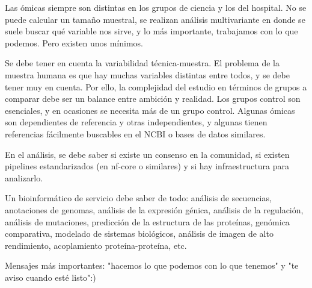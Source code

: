 Las ómicas siempre son distintas en los grupos de ciencia y los del hospital. No se puede calcular un tamaño muestral, se realizan análisis multivariante en donde se suele buscar qué variable nos sirve, y lo más importante, trabajamos con lo que podemos. Pero existen unos mínimos. 

Se debe tener en cuenta la variabilidad técnica-muestra. El problema de la muestra humana es que hay muchas variables distintas entre todos, y se debe tener muy en cuenta. Por ello, la complejidad del estudio en términos de grupos a comparar debe ser un balance entre ambición y realidad. Los grupos control son esenciales, y en ocasiones se necesita más de un grupo control. Algunas ómicas son dependientes de referencia y otras independientes, y algunas tienen referencias fácilmente buscables en el NCBI o bases de datos similares. 

En el análisis, se debe saber si existe un consenso en la comunidad, si existen pipelines estandarizados (en nf-core o similares) y si hay infraestructura para analizarlo. 

Un bioinformático de servicio debe saber de todo: análisis de secuencias, anotaciones de genomas, análisis de la expresión génica, análisis de la regulación, análisis de mutaciones, predicción de la estructura de las proteínas, genómica comparativa, modelado de sistemas biológicos, análisis de imagen de alto rendimiento, acoplamiento proteína-proteína, etc.

Mensajes más importantes: "hacemos lo que podemos con lo que tenemos" y "te aviso cuando esté listo":)